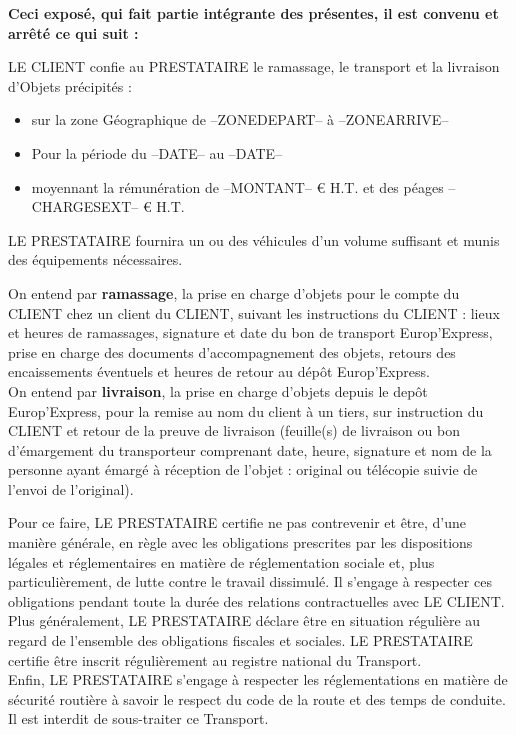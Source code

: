 \documentclass[a4paper, oneside, 8pt, french]{article}
\begin{document}
\textbf{Ceci exposé, qui fait partie intégrante des présentes, il est convenu et arrêté ce qui suit :}\\
\begin{fminipage}
{LE CLIENT confie au PRESTATAIRE le ramassage, le transport et la livraison d'Objets précipités :}
\begin{itemize}
\item[\textbullet]sur la zone Géographique de --ZONEDEPART-- à --ZONEARRIVE--
\item[\textbullet]Pour la période du --DATE-- au --DATE--
\item[\textbullet]moyennant la rémunération de --MONTANT-- € H.T. et des péages --CHARGESEXT-- € H.T.
\end{itemize}
\end{fminipage}

LE PRESTATAIRE fournira un ou des véhicules d'un volume suffisant et munis des équipements nécessaires.

On entend par \textbf{ramassage}, la prise en charge d'objets pour le compte du CLIENT chez un client du CLIENT, suivant les instructions du CLIENT : lieux et heures de ramassages, signature et date du bon de transport Europ'Express, prise en charge des documents d'accompagnement des objets, retours des encaissements éventuels et heures de retour au dépôt Europ'Express.\\
On entend par \textbf{livraison}, la prise en charge d'objets depuis le depôt Europ'Express, pour la remise au nom du client à un tiers, sur instruction du CLIENT et retour de la preuve de livraison (feuille(s) de livraison ou bon d'émargement du transporteur comprenant date, heure, signature et nom de la personne ayant émargé à réception de l'objet : original ou télécopie suivie de l'envoi de l'original).

Pour ce faire, LE PRESTATAIRE certifie ne pas contrevenir et être, d'une manière générale, en règle avec les obligations prescrites par les dispositions légales et réglementaires en matière de réglementation sociale et, plus particulièrement, de lutte contre le travail dissimulé. Il s'engage à respecter ces obligations pendant toute la durée des relations contractuelles avec LE CLIENT. Plus généralement, LE PRESTATAIRE déclare être en situation régulière au regard de l'ensemble des obligations fiscales et sociales. LE PRESTATAIRE certifie être inscrit régulièrement au registre national du Transport.\\
Enfin, LE PRESTATAIRE s'engage à respecter les réglementations en matière de sécurité routière à savoir le respect du code de la route et des temps de conduite.\\
Il est interdit de sous-traiter ce Transport.
\end{document}
